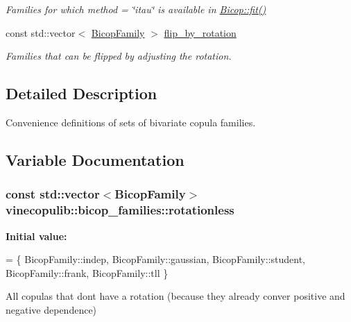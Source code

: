 \begin{DoxyCompactItemize}
\begin{DoxyCompactList}\small\item\em Families for which {\ttfamily method = \char`\"{}itau\char`\"{}} is available in \hyperlink{classvinecopulib_1_1_bicop_a2d509a8b404a73ef17f04a0678e90a71}{Bicop\+::fit()} \end{DoxyCompactList}\item 
const std\+::vector$<$ \hyperlink{namespacevinecopulib_a42e95cc06d33896199caab0c11ad44f3}{Bicop\+Family} $>$ \hyperlink{namespacevinecopulib_1_1bicop__families_ae1ae1673e3d4a9c57bd9df074e17a3b9}{flip\+\_\+by\+\_\+rotation}\hypertarget{namespacevinecopulib_1_1bicop__families_ae1ae1673e3d4a9c57bd9df074e17a3b9}{}\label{namespacevinecopulib_1_1bicop__families_ae1ae1673e3d4a9c57bd9df074e17a3b9}

\begin{DoxyCompactList}\small\item\em Families that can be flipped by adjusting the rotation. \end{DoxyCompactList}\end{DoxyCompactItemize}


\subsection{Detailed Description}
Convenience definitions of sets of bivariate copula families. 

\subsection{Variable Documentation}
\subsubsection[{\texorpdfstring{rotationless}{rotationless}}]{\setlength{\rightskip}{0pt plus 5cm}const std\+::vector$<${\bf Bicop\+Family}$>$ vinecopulib\+::bicop\+\_\+families\+::rotationless}\hypertarget{namespacevinecopulib_1_1bicop__families_ac221bc84c32d2836692ed40d89439928}{}\label{namespacevinecopulib_1_1bicop__families_ac221bc84c32d2836692ed40d89439928}
{\bfseries Initial value\+:}
\begin{DoxyCode}
= \{
            BicopFamily::indep, 
            BicopFamily::gaussian, 
            BicopFamily::student, 
            BicopFamily::frank, 
            BicopFamily::tll
        \}
\end{DoxyCode}
All copulas that don\textquotesingle{}t have a rotation (because they already conver positive and negative dependence) 
